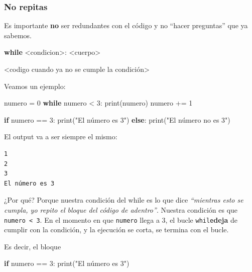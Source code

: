 \documentclass[
  letterpaper,
  DIV=11,
  numbers=noendperiod]{scrreprt}
\newenvironment{Shaded}{\begin{snugshade}}{\end{snugshade}}
\newcommand{\BuiltInTok}[1]{\textcolor[rgb]{0.00,0.23,0.31}{#1}}
\newcommand{\ControlFlowTok}[1]{\textcolor[rgb]{0.00,0.23,0.31}{\textbf{#1}}}
\newcommand{\DecValTok}[1]{\textcolor[rgb]{0.68,0.00,0.00}{#1}}
\newcommand{\NormalTok}[1]{\textcolor[rgb]{0.00,0.23,0.31}{#1}}
\newcommand{\OperatorTok}[1]{\textcolor[rgb]{0.37,0.37,0.37}{#1}}
\newcommand{\StringTok}[1]{\textcolor[rgb]{0.13,0.47,0.30}{#1}}
\begin{document}
\subsubsection{No repitas}\label{no-repitas}

Es importante \textbf{no} ser redundantes con el código y no ``hacer
preguntas'' que ya sabemos.

\begin{Shaded}
\begin{Highlighting}[]
\ControlFlowTok{while} \OperatorTok{\textless{}}\NormalTok{condicion}\OperatorTok{\textgreater{}}\NormalTok{:}
  \OperatorTok{\textless{}}\NormalTok{cuerpo}\OperatorTok{\textgreater{}}

\OperatorTok{\textless{}}\NormalTok{codigo cuando ya no se cumple la condición}\OperatorTok{\textgreater{}}
\end{Highlighting}
\end{Shaded}

Veamos un ejemplo:

\begin{Shaded}
\begin{Highlighting}[]
\NormalTok{numero }\OperatorTok{=} \DecValTok{0}
\ControlFlowTok{while}\NormalTok{ numero }\OperatorTok{\textless{}} \DecValTok{3}\NormalTok{:}
  \BuiltInTok{print}\NormalTok{(numero)}
\NormalTok{  numero }\OperatorTok{+=} \DecValTok{1}

\ControlFlowTok{if}\NormalTok{ numero }\OperatorTok{==} \DecValTok{3}\NormalTok{:}
  \BuiltInTok{print}\NormalTok{(}\StringTok{"El número es 3"}\NormalTok{)}
\ControlFlowTok{else}\NormalTok{:}
  \BuiltInTok{print}\NormalTok{(}\StringTok{"El número no es 3"}\NormalTok{)}
\end{Highlighting}
\end{Shaded}

El output va a ser siempre el mismo:

\begin{verbatim}
1
2
3
El número es 3
\end{verbatim}

¿Por qué? Porque nuestra condición del while es lo que dice
\emph{``mientras esto se cumpla, yo repito el bloque del código de
adentro''}. Nuestra condición es que \texttt{numero\ \textless{}\ 3}. En
el momento en que \texttt{numero} llega a 3, el bucle
\texttt{while}\textbf{deja} de cumplir con la condición, y la ejecución
se corta, se termina con el bucle.

Es decir, el bloque

\begin{Shaded}
\begin{Highlighting}[]
\ControlFlowTok{if}\NormalTok{ numero }\OperatorTok{==} \DecValTok{3}\NormalTok{:}
  \BuiltInTok{print}\NormalTok{(}\StringTok{"El número es 3"}\NormalTok{)}
\end{Highlighting}
\end{Shaded}
\end{document}
